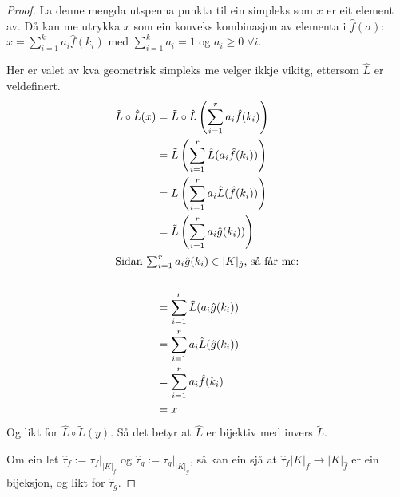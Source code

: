 \documentclass[a4paper, 12pt, norsk]{article}
\theoremstyle{plain}
\theoremstyle{definition}
\newcommand{\gr}[1]{ \lvert #1 \rvert } %
\begin{document}
\begin{proof}
	La denne mengda utspenna punkta til ein simpleks som $x$ er eit element av. Då kan me utrykka $x$ som ein konveks kombinasjon av elementa i $\hat{f}(\sigma)$: $x=\sum_{i=1}^ka_i\hat{f}(k_i)$ med $\sum_{i=1}^ka_i=1$ og $a_i\geq0\; \forall i$. 
	
	Her er valet av kva geometrisk simpleks me velger ikkje vikitg, ettersom $\hat{L}$ er veldefinert.
	\begin{align*}
		\tilde{L}\circ \hat{L}(x) &= \tilde{L}\circ \hat{L}\left(\sum_{i=1}^ra_i\hat{f}(k_i)\right) \\
		&= \tilde{L}\left(\sum_{i=1}^r\hat{L}(a_i\hat{f}(k_i))\right) \\
		&= \tilde{L}\left(\sum_{i=1}^ra_i\hat{L}(\hat{f}(k_i))\right) \\
		&= \tilde{L}\left(\sum_{i=1}^ra_i\hat{g}(k_i))\right) \\
		\intertext{Sidan $\sum_{i=1}^ra_i\hat{g}(k_i)\in\gr{K}_{\hat{g}}$, så får me:} \\
		&= \sum_{i=1}^r\tilde{L}(a_i\hat{g}(k_i)) \\
		&= \sum_{i=1}^ra_i\tilde{L}(\hat{g}(k_i)) \\
		&= \sum_{i=1}^ra_i\hat{f}(k_i) \\
		&= x
	\end{align*}
	Og likt for $\hat{L}\circ\tilde{L}(y)$.
	Så det betyr at $\hat{L}$ er bijektiv med invers $\tilde{L}$.
	
	Om ein let $\hat{\tau}_f:=\tau_f|_{\gr{K}_f}$ og $\hat{\tau}_g:=\tau_g|_{\gr{K}_g}$, så kan ein sjå at $\hat{\tau}_f\gr{K}_f\to\gr{K}_{\hat{f}}$ er ein bijeksjon, og likt for $\hat{\tau}_g$.
	

\end{proof}
\end{document}
